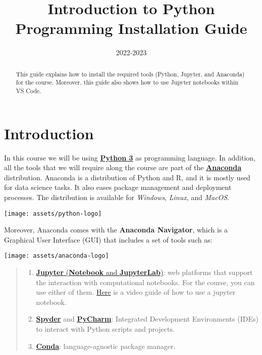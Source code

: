 \documentclass{latex-template/tufte-handout}
\title{Introduction to Python Programming Installation Guide}
\date{2022-2023} %
\begin{document}
\maketitle%

\begin{abstract}
\noindent
This guide explains how to install the required tools (Python, Jupyter, and Anaconda) for the course.
Moreover, this guide also shows how to use Jupyter notebooks within VS Code.

\end{abstract}




\section{Introduction} \label{introduction}



In this course we will be using \href{https://www.python.org}{\textbf{Python 3}} as programming language. In addition, all the tools that we will require along the course are part of the \href{https://anaconda.org}{\textbf{Anaconda}} distribution. 
Anaconda is a distribution of Python and R, and it is mostly used for data science tasks. It also eases package management and deployment processes. The distribution is available for \emph{Windows}, \emph{Linux}, and \emph{MacOS}.
\begin{marginfigure}%
  \texttt{[image: assets/python-logo]}
  \label{fig:marginfig}
\end{marginfigure}

Moreover, Anaconda comes with the \textbf{Anaconda Navigator}, which is
a Graphical User Interface (GUI) that includes a set of tools such as:
\begin{marginfigure}%
  \texttt{[image: assets/anaconda-logo]}
  \label{fig:marginfig}
\end{marginfigure}

\begin{quote}
\begin{enumerate}
\item
  \href{https://jupyter.org}{\textbf{Jupyter} (\textbf{Notebook} and
  \textbf{JupyterLab})}: web platforms that support the interaction with
  computational notebooks. For the course, you can use either of them. \href{https://canvas.vu.nl/files/5301230/download?download_frd=1}{Here} is a video guide of how to use a jupyter notebook.
\item
  \href{https://www.spyder-ide.org}{\textbf{Spyder}} and
  \href{https://www.jetbrains.com/pycharm/}{\textbf{PyCharm}}:
  Integrated Development Environments (IDEs) to interact with Python
  scripts and projects.
\item
  \href{https://docs.conda.io/en/latest/}{\textbf{Conda}}:
  language-agnostic package manager.
\end{enumerate}
\end{quote}
\end{document}
